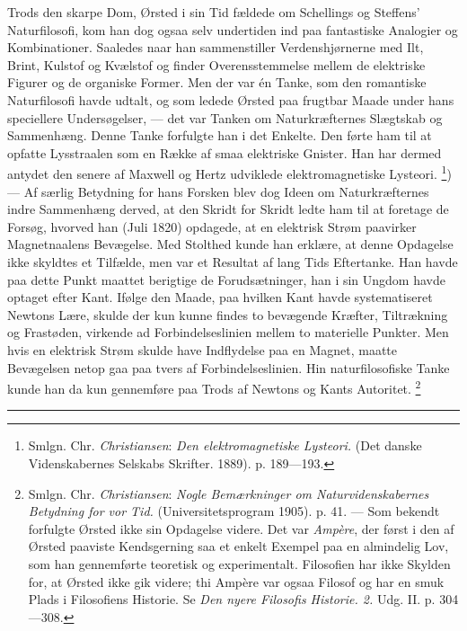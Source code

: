 \documentclass[12pt,a4paper,openany]{book}
\newcommand{\opage}[1]{\marginnote{\footnotesize\textit{[#1]}}}
\begin{document}
Trods den skarpe Dom, Ørsted i sin Tid fældede om Schellings og Steffens'
Naturfilosofi, kom han dog ogsaa selv undertiden ind paa fantastiske Analogier
og Kombinationer. Saaledes naar han sammenstiller Verdenshjørnerne med Ilt,
Brint, Kulstof og Kvælstof og finder Overensstemmelse mellem de elektriske
Figurer og de organiske Former. Men der
\setcounter{footnote}{0}%
\opage{53}var én Tanke, som den romantiske Naturfilosofi havde udtalt, og som
ledede Ørsted paa frugtbar Maade under hans speciellere Undersøgelser, --- det
var Tanken om Naturkræfternes Slægtskab og Sammenhæng. Denne Tanke forfulgte
han i det Enkelte. Den førte ham til at opfatte Lysstraalen som en Række af
smaa elektriske Gnister. Han har dermed antydet den senere af Maxwell og Hertz
udviklede elektromagnetiske Lysteori.%
\footnote[1]{Smlgn. Chr. \emph{Christiansen}: \textit{Den elektromagnetiske
Lysteori.} (Det danske Videnskabernes Selskabs Skrifter. 1889). p. 189---193.})
--- Af særlig Betydning for hans Forsken blev dog Ideen om Naturkræfternes
indre Sammenhæng derved, at den Skridt for Skridt ledte ham til at foretage de
Forsøg, hvorved han (Juli 1820) opdagede, at en elektrisk Strøm paavirker
Magnetnaalens Bevægelse. Med Stolthed kunde han erklære, at denne Opdagelse
ikke skyldtes et Tilfælde, men var et Resultat af lang Tids Eftertanke. Han
havde paa dette Punkt maattet berigtige de Forudsætninger, han i sin Ungdom
havde optaget efter Kant. Ifølge den Maade, paa hvilken Kant havde
systematiseret Newtons Lære, skulde der kun kunne findes to bevægende Kræfter,
Tiltrækning og Frastøden, virkende ad Forbindelseslinien mellem to materielle
Punkter. Men hvis en elektrisk Strøm skulde have Indflydelse paa en Magnet,
maatte Bevægelsen netop gaa paa tvers af Forbindelseslinien. Hin
naturfilosofiske Tanke kunde han da kun gennemføre paa Trods af Newtons og
Kants Autoritet.%
\footnote[2]{Smlgn. Chr. \emph{Christiansen}: \textit{Nogle Bemærkninger om
Naturvidenskabernes Betydning for vor Tid.} (Universitetsprogram 1905). p. 41.
--- Som bekendt forfulgte Ørsted ikke sin Opdagelse videre. Det var
\emph{Ampère}, der først i den af Ørsted paaviste Kendsgerning saa et enkelt
Exempel paa en almindelig Lov, som han gennemførte teoretisk og experimentalt.
Filosofien har ikke Skylden for, at Ørsted ikke gik videre; thi Ampère var
ogsaa Filosof og har en smuk Plads i Filosofiens Historie. Se \textit{Den nyere
Filosofis Historie. 2.} Udg. II. p. 304---308.}

\begin{center}\rule{2cm}{0.4pt}\end{center}
\end{document}
